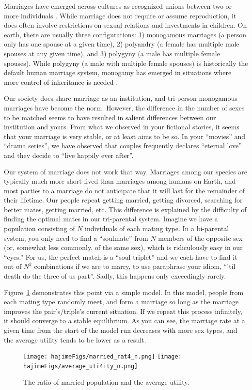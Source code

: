 \documentclass{report}
\begin{document}
Marriages have emerged across cultures as recognized unions between two or more individuals \cite{Fortunato2015}. While marriage does not require or assume reproduction, it does often involve restrictions on sexual relations and investments in children. On earth, there are usually three configurations: 1) monogamous marriages (a person only has one spouse at a given time), 2) polyandry (a female has multiple male spouses at any given time), and 3) polygyny (a male has multiple female spouses). While polygyny (a male with multiple female spouses) is historically the default human marriage system, monogamy has emerged in situations where more control of inheritance is needed \cite{Fortunato2015, Fortunato2009}. 

Our society does share marriage as an institution, and tri-person monogamous marriages have become the norm. However, the difference in the number of sexes to be matched seems to have resulted in salient differences between our institution and yours. From what we observed in your fictional stories, it seems that your marriage is very stable, or at least aims to be so. In your ``movies'' and ``drama series'', we have observed that couples frequently declares ``eternal love'' and they decide to ``live happily ever after''. 

Our system of marriage does not work that way. Marriages among our species are typically much more short-lived than marriages among humans on Earth, and most parties to a marriage do not anticipate that it will last for the remainder of their lifetime. Our people repeat getting married, getting divorced, searching for better mates, getting married, etc. This difference is explained by the difficulty of finding the optimal mates in our tri-parental system. Imagine we have a population consisting of $N$ individuals of each mating type. In a bi-parental system, you only need to find a ``soulmate'' from $N$ members of the opposite sex (or, somewhat less commonly, of the same sex), which is ridiculously easy in our ``eyes.'' For us, the perfect match is a ``soul-triplet'' and we each have to find it out of $N^2$ combinations if we are to marry, to use paraphrase your idiom, ``'til  death do the three of us part''. Sadly, this happens only exceedingly rarely.

Figure~\ref{fig:married_rate} demonstrates this point via a simple model. In this model, people from each mating type randomly meet, and form a marriage so long as the marriage improves the pair's/triple's current situation. If we repeat this process infinitely, it should converge to a stable equilibrium. As you can see, the marriage rate at a given time from the start of the model run decreases with more sex types, and the average utility tends to be lower as a result.
\begin{figure}[htb!]
    \centering
    \texttt{[image: hajimeFigs/married\_rat4\_n.png]}
    \texttt{[image: hajimeFigs/average\_uti4ity\_n.png]}
    \caption{The ratio of married population and the average utility.}
    \label{fig:married_rate}
\end{figure}
\end{document}
